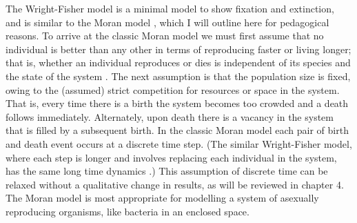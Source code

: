 The Wright-Fisher model is a minimal model to show fixation and extinction, and is similar to the Moran model \cite{Moran1962}, which I will outline here for pedagogical reasons. 
To arrive at the classic Moran model we must first assume that no individual is better than any other in terms of reproducing faster or living longer; that is, whether an individual reproduces or dies is independent of its species and the state of the system \cite{Moran1962}. %
The next assumption is that the population size is fixed, owing to the (assumed) strict competition for resources or space in the system. 
That is, every time there is a birth the system becomes too crowded and a death follows immediately. 
Alternately, upon death there is a vacancy in the system that is filled by a subsequent birth.
In the classic Moran model each pair of birth and death event occurs at a discrete time step. 
(The similar Wright-Fisher model, where each step is longer and involves replacing each individual in the system, has the same long time dynamics \cite{Blythe2007}.) 
This assumption of discrete time can be relaxed without a qualitative change in results, as will be reviewed in chapter 4. %
The Moran model is most appropriate for modelling a system of asexually reproducing organisms, like bacteria in an enclosed space. %

